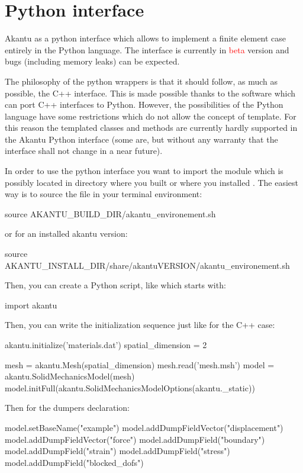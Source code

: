 \chapter{Python interface\label{sect:python}}

Akantu as a python interface which allows to implement a finite
element case entirely in the Python language.  The interface is
currently in \textcolor{red}{beta} version and bugs (including memory
leaks) can be expected.

The philosophy of the python wrappers is that it should follow, as
much as possible, the C++ interface. This is made possible thanks to
the \href{SWIG}{} software which can port C++ interfaces to Python.
However, the possibilities of the Python language have some
restrictions which do not allow the concept of template. For this
reason the templated classes and methods are currently hardly
supported in the Akantu Python interface (some are, but without any
warranty that the interface shall not change in a near future).

In order to use the python interface you want to import the
 module which is possibly located in directory where you
built or where you installed \akantu.  The easiest way is to source
the file  in your terminal environment:

\begin{command}
source AKANTU_BUILD_DIR/akantu_environement.sh
\end{command}

or for an installed akantu version:

\begin{command}
source AKANTU_INSTALL_DIR/share/akantuVERSION/akantu_environement.sh
\end{command}

Then, you can create a Python script, like  which
starts with:

\begin{python}
import akantu
\end{python}

Then, you can write the initialization sequence just like for the C++
case:

\begin{python}
akantu.initialize('materials.dat') spatial_dimension = 2
   
mesh = akantu.Mesh(spatial_dimension) mesh.read('mesh.msh')
model = akantu.SolidMechanicsModel(mesh)
model.initFull(akantu.SolidMechanicsModelOptions(akantu._static))
\end{python}
Then for the dumpers declaration:
\begin{python}
model.setBaseName("example") model.addDumpFieldVector("displacement")
model.addDumpFieldVector("force") model.addDumpField("boundary")
model.addDumpField("strain") model.addDumpField("stress")
model.addDumpField("blocked_dofs")
\end{python}

